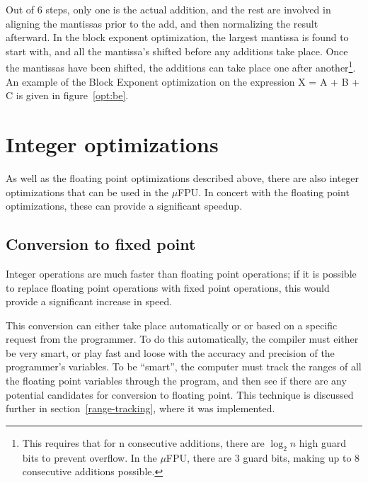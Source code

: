 Out of 6 steps, only one is the actual addition, and the rest are involved
in aligning the mantissas prior to the add, and then normalizing the result
afterward.  In the block exponent optimization, the largest mantissa is
found to start with, and all the mantissa's shifted before any additions
take place.  Once the mantissas have been shifted, the additions can take
place one after another\footnote{This requires that for n consecutive
additions, there are $\log_{2}n$ high guard bits to prevent overflow.  In
the $\mu$FPU, there are 3 guard bits, making up to 8 consecutive additions
possible.}.  An example of the Block Exponent optimization on the expression
X = A + B + C is given in figure~\ref{opt:be}.

%

\section{Integer optimizations}

As well as the floating point optimizations described above, there are
also integer optimizations that can be used in the $\mu$FPU.  In concert
with the floating point optimizations, these can provide a significant
speedup.  

\subsection{Conversion to fixed point}

Integer operations are much faster than floating point operations; if it is
possible to replace floating point operations with fixed point operations,
this would provide a significant increase in speed.

This conversion can either take place automatically or or based on a
specific request from the programmer.  To do this automatically, the
compiler must either be very smart, or play fast and loose with the accuracy
and precision of the programmer's variables.  To be ``smart'', the computer
must track the ranges of all the floating point variables through the
program, and then see if there are any potential candidates for conversion
to floating point.  This technique is discussed further in
section~\ref{range-tracking}, where it was implemented.

